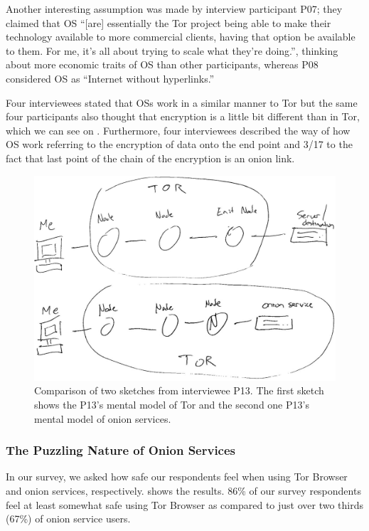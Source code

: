 Another interesting assumption was made by interview participant P07; they
claimed that OS ``[are] essentially the Tor project being able to make their
technology available to more commercial clients, having that option be available
to them.  For me, it's all about trying to scale what they're doing.'', thinking
about more economic traits of OS than other participants, whereas P08 considered
OS as ``Internet without hyperlinks.''

Four interviewees stated that OSs work in a similar manner to Tor but the same
four participants also thought that encryption is a little bit different than in
Tor, which we can see on .  Furthermore, four
interviewees described the way of how OS work referring to the encryption of
data onto the end point and 3/17 to the fact that last point of the chain of the
encryption is an onion link. 

\begin{figure}[t]
        \centering
        \includegraphics[width=0.8\linewidth]{figures/P13bothSketches.jpg}
        \caption{Comparison of two sketches from interviewee P13.  The first
        sketch shows the P13's mental model of Tor and the second one P13's
        mental model of onion services.}
        \label{fig:toros-sketch}
\end{figure}

\subsubsection{The Puzzling Nature of Onion Services}

In our survey, we asked how safe our respondents feel when using Tor Browser and
onion services, respectively.   shows the results.
86\% of our survey respondents feel at least somewhat safe using Tor Browser as
compared to just over two thirds (67\%) of onion service users.

